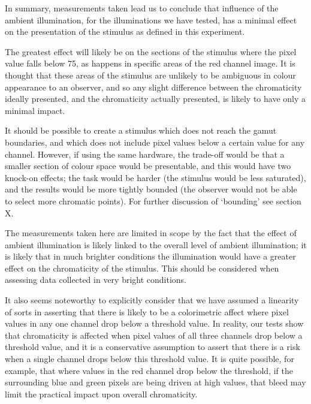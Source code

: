 

In summary, measurements taken lead us to conclude that influence of the ambient illumination, for the illuminations we have tested, has a minimal effect on the presentation of the stimulus as defined in this experiment. 

The greatest effect will likely be on the sections of the stimulus where the pixel value falls below 75, as happens in specific areas of the red channel image. It is thought that these areas of the stimulus are unlikely to be ambiguous in colour appearance to an observer, and so any slight difference between the chromaticity ideally presented, and the chromaticity actually presented, is likely to have only a minimal impact. 

It should be possible to create a stimulus which does not reach the gamut boundaries, and which does not include pixel values below a certain value for any channel. However, if using the same hardware, the trade-off would be that a smaller section of colour space would be presentable, and this would have two knock-on effects; the task would be harder (the stimulus would be less saturated), and the results would be more tightly bounded (the observer would not be able to select more chromatic points). For further discussion of `bounding' see section X. %

The measurements taken here are limited in scope by the fact that the effect of ambient illumination is likely linked to the overall level of ambient illumination; it is likely that in much brighter conditions the illumination would have a greater effect on the chromaticity of the stimulus. This should be considered when assessing data collected in very bright conditions.

It also seems noteworthy to explicitly consider that we have assumed a linearity of sorts in asserting that there is likely to be a colorimetric affect where pixel values in any one channel drop below a threshold value. In reality, our tests show that chromaticity is affected when pixel values of all three channels drop below a threshold value, and it is a conservative assumption to assert that there is a risk when a single channel drops below this threshold value. It is quite possible, for example, that where values in the red channel drop below the threshold, if the surrounding blue and green pixels are being driven at high values, that bleed may limit the practical impact upon overall chromaticity.

